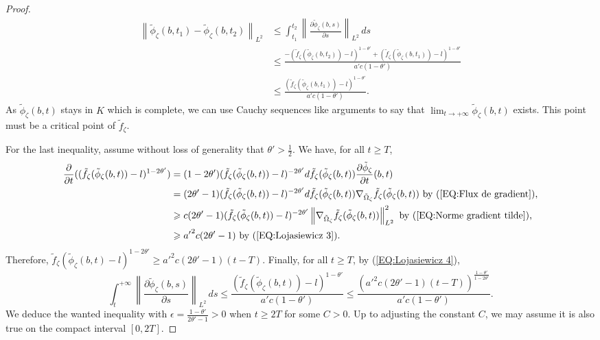 \documentclass{article}
\theoremstyle{remark}
\theoremstyle{definition}
\newcommand{\norme}[1]{\left\| #1 \right\|}
\renewcommand{\leq}{\leqslant}
\renewcommand{\geq}{\geqslant}
\begin{document}
\begin{proof}
\begin{align}
    \norme{\tilde{\phi}_\zeta(b,t_1) - \tilde{\phi}_\zeta(b,t_2)}_{L^2} & \leq \int_{t_1}^{t_2} \norme{\frac{\partial\tilde{\phi}_\zeta(b,s)}{\partial s}}_{L^2} \, ds \nonumber\\
    & \leq \frac{-(\tilde{f}_\zeta(\tilde{\phi}_\zeta(b,t_2)) - l)^{1 - \theta'} + (\tilde{f}_\zeta(\tilde{\phi}_\zeta(b,t_1)) - l)^{1 - \theta'}}{a'c(1 - \theta')} \nonumber\\
    & \leq \frac{(\tilde{f}_\zeta(\tilde{\phi}_\zeta(b,t_1)) - l)^{1 - \theta'}}{a'c(1 - \theta')}. \label{EQ:Lojasiewicz 4}
\end{align}
As $\tilde{\phi}_\zeta(b,t)$ stays in $K$ which is complete, we can use Cauchy sequences like arguments to say that $\lim_{t \rightarrow +\infty} \tilde{\phi}_\zeta(b,t)$ exists. This point must be a critical point of $\tilde{f}_\zeta$.

For the last inequality, assume without loss of generality that $\theta' > \frac{1}{2}$. We have, for all $t \geq T$,
\begin{align*}
    \frac{\partial}{\partial t}((\tilde{f}_\zeta(\tilde{\phi}_\zeta(b,t)) - l)^{1 - 2\theta'}) & = (1 - 2\theta')(\tilde{f}_\zeta(\tilde{\phi}_\zeta(b,t)) - l)^{-2\theta'}d\tilde{f}_\zeta(\tilde{\phi}_\zeta(b,t))\frac{\partial \tilde{\phi}_\zeta}{\partial t}(b,t)\\
    & = (2\theta' - 1)(\tilde{f}_\zeta(\tilde{\phi}_\zeta(b,t)) - l)^{-2\theta'}d\tilde{f}_\zeta(\tilde{\phi}_\zeta(b,t))\nabla_{\tilde{\Omega}_\zeta}\tilde{f}_\zeta(\tilde{\phi}_\zeta(b,t)) \textrm{ by (\ref{EQ:Flux de gradient}),}\\
    & \geq c(2\theta' - 1)(\tilde{f}_\zeta(\tilde{\phi}_\zeta(b,t)) - l)^{-2\theta'}\norme{\nabla_{\tilde{\Omega}_\zeta}\tilde{f}_\zeta(\tilde{\phi}_\zeta(b,t))}_{L^2}^2 \textrm{ by (\ref{EQ:Norme gradient tilde}),}\\
    & \geq {a'}^2c(2\theta' - 1) \textrm{ by (\ref{EQ:Lojasiewicz 3}).}
\end{align*}
Therefore, $\tilde{f}_\zeta(\tilde{\phi}_\zeta(b,t) - l)^{1 - 2\theta'} \geq {a'}^2c(2\theta' - 1)(t - T)$. Finally, for all $t \geq T$, by (\ref{EQ:Lojasiewicz 4}),
$$
\int_t^{+\infty} \norme{\frac{\partial\tilde{\phi}_\zeta(b,s)}{\partial s}}_{L^2} \, ds \leq \frac{(\tilde{f}_\zeta(\tilde{\phi}_\zeta(b,t)) - l)^{1 - \theta'}}{a'c(1 - \theta')} \leq \frac{({a'}^2c(2\theta' - 1)(t - T))^{\frac{1 - \theta'}{1 - 2\theta'}}}{a'c(1 - \theta')}.
$$
We deduce the wanted inequality with $\epsilon = \frac{1 - \theta'}{2\theta' - 1} > 0$ when $t \geq 2T$ for some $C > 0$. Up to adjusting the constant $C$, we may assume it is also true on the compact interval $[0,2T]$.
\end{proof}
\end{document}
